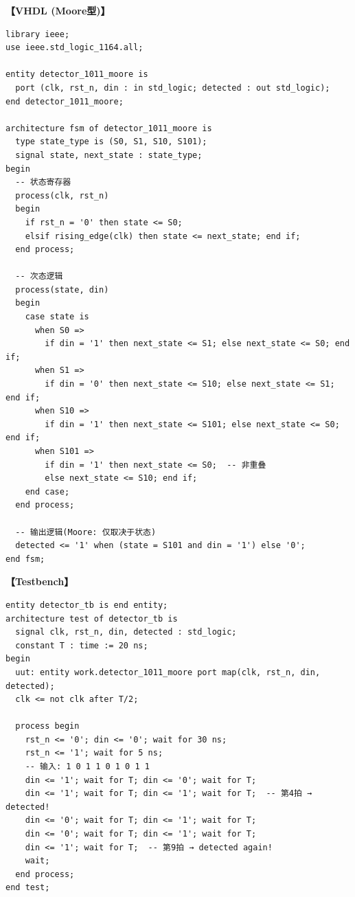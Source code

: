 \begin{solution}[完整解答]
\textbf{【VHDL (Moore型)】}
\begin{lstlisting}
library ieee;
use ieee.std_logic_1164.all;

entity detector_1011_moore is
  port (clk, rst_n, din : in std_logic; detected : out std_logic);
end detector_1011_moore;

architecture fsm of detector_1011_moore is
  type state_type is (S0, S1, S10, S101);
  signal state, next_state : state_type;
begin
  -- 状态寄存器
  process(clk, rst_n)
  begin
    if rst_n = '0' then state <= S0;
    elsif rising_edge(clk) then state <= next_state; end if;
  end process;

  -- 次态逻辑
  process(state, din)
  begin
    case state is
      when S0 =>
        if din = '1' then next_state <= S1; else next_state <= S0; end if;
      when S1 =>
        if din = '0' then next_state <= S10; else next_state <= S1; end if;
      when S10 =>
        if din = '1' then next_state <= S101; else next_state <= S0; end if;
      when S101 =>
        if din = '1' then next_state <= S0;  -- 非重叠
        else next_state <= S10; end if;
    end case;
  end process;

  -- 输出逻辑(Moore: 仅取决于状态)
  detected <= '1' when (state = S101 and din = '1') else '0';
end fsm;
\end{lstlisting}

\textbf{【Testbench】}
\begin{lstlisting}
entity detector_tb is end entity;
architecture test of detector_tb is
  signal clk, rst_n, din, detected : std_logic;
  constant T : time := 20 ns;
begin
  uut: entity work.detector_1011_moore port map(clk, rst_n, din, detected);
  clk <= not clk after T/2;

  process begin
    rst_n <= '0'; din <= '0'; wait for 30 ns;
    rst_n <= '1'; wait for 5 ns;
    -- 输入: 1 0 1 1 0 1 0 1 1
    din <= '1'; wait for T; din <= '0'; wait for T;
    din <= '1'; wait for T; din <= '1'; wait for T;  -- 第4拍 → detected!
    din <= '0'; wait for T; din <= '1'; wait for T;
    din <= '0'; wait for T; din <= '1'; wait for T;
    din <= '1'; wait for T;  -- 第9拍 → detected again!
    wait;
  end process;
end test;
\end{lstlisting}


\end{solution}

